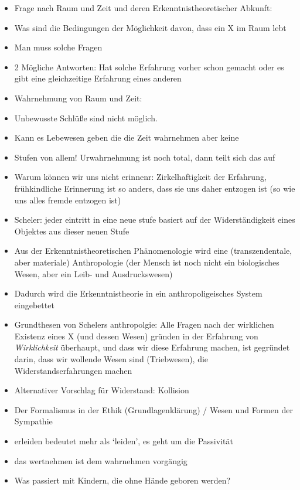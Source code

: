 \documentclass[emulatestandardclasses]{scrartcl}
\begin{document}
\begin{itemize}
  \item Frage nach Raum und Zeit und deren Erkenntnistheoretischer Abkunft: 
  \item Was sind die Bedingungen der Möglichkeit davon, dass ein X im Raum lebt
  \item Man muss solche Fragen 
  \item 2 Mögliche Antworten: Hat solche Erfahrung vorher schon gemacht oder es gibt eine gleichzeitige Erfahrung eines anderen
  \item Wahrnehmung von Raum und Zeit: 
  \item Unbewusste Schlüße sind nicht möglich. 
  \item Kann es Lebewesen geben die die Zeit wahrnehmen aber keine
  \item Stufen von allem! Urwahrnehmung ist noch total, dann teilt sich das auf
  \item Warum können wir uns nicht erinnenr: Zirkelhaftigkeit der Erfahrung, frühkindliche Erinnerung ist so anders, dass sie uns daher entzogen ist (so wie uns alles fremde entzogen ist)
  \item Scheler: jeder eintritt in eine neue stufe basiert auf der Widerständigkeit eines Objektes aus dieser neuen Stufe
  \item Aus der Erkenntnistheoretischen Phänomenologie wird eine (transzendentale, aber materiale) Anthropologie (der Mensch ist noch nicht ein biologisches Wesen, aber ein Leib- und Ausdruckswesen)
  \item Dadurch wird die Erkenntnistheorie in ein anthropoligeisches System eingebettet
  \item Grundthesen von Schelers anthropolgie: Alle Fragen nach der wirklichen Existenz eines X (und dessen Wesen) gründen in der Erfahrung von \emph{Wirklichkeit} überhaupt, und dass wir diese Erfahrung machen, ist gegründet darin, dass wir wollende Wesen sind (Triebwesen), die Widerstandserfahrungen machen 
  \item Alternativer Vorschlag für Widerstand: Kollision
  \item Der Formalismus in der Ethik (Grundlagenklärung) / Wesen und Formen der Sympathie
  \item erleiden bedeutet mehr als `leiden', es geht um die Passivität
  \item das wertnehmen ist dem wahrnehmen vorgängig
\end{itemize}

\begin{itemize}
  \item Was passiert mit Kindern, die ohne Hände geboren werden?
\end{itemize}
\end{document}
